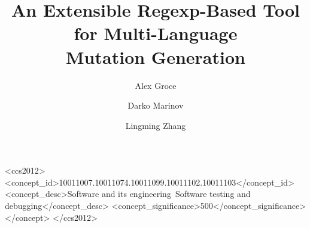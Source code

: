 \documentclass[sigconf]{acmart}
\title{An Extensible Regexp-Based Tool for Multi-Language\\ Mutation Generation }
\author{
Alex Groce \and Darko Marinov \and Lingming Zhang
}
\begin{document}
\begin{CCSXML}
<ccs2012>
<concept_id>10011007.10011074.10011099.10011102.10011103</concept_id>
<concept_desc>Software and its engineering~Software testing and debugging</concept_desc>
<concept_significance>500</concept_significance>
</concept>
</ccs2012>
\end{CCSXML}





\maketitle












\end{document}
